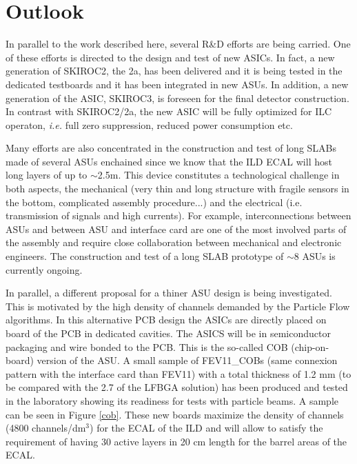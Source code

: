 \documentclass[a4paper,11pt]{article}
\begin{document}
\section{Outlook}
\label{sec:outlook}

In parallel to the work described here, several R\&D efforts are being carried.
One of these efforts is directed to the design and test of new ASICs.
In fact, a new generation of SKIROC2, the 2a, has been delivered
and it is being tested in the dedicated testboards and it has been integrated in new ASUs.
In addition, a new generation of the ASIC, SKIROC3, is foreseen for the final detector construction.
In contrast with SKIROC2/2a, the new ASIC will be fully optimized for ILC operaton, {\it i.e.} full zero suppression, reduced power consumption etc.

Many efforts are also concentrated in the construction and test of long SLABs
made of several ASUs enchained since we know that the ILD ECAL will host long layers of up to $\sim$2.5m.
This device constitutes a technological challenge in both aspects, the mechanical
(very thin and long structure with fragile sensors in the bottom, complicated assembly procedure...)
and the electrical (i.e. transmission of signals and high currents).
For example, interconnections between ASUs and between ASU and interface card are one of
the most involved parts of the assembly
and require close collaboration between mechanical and electronic engineers.
The construction and test of a long SLAB prototype
of $\sim8$ ASUs is currently ongoing.

In parallel, a different proposal for a thiner ASU
design is being investigated. This is motivated by the high density of channels
demanded by the Particle Flow algorithms. 
In this alternative PCB design the ASICs
are directly placed on board of the PCB in dedicated cavities.
The ASICS will be in semiconductor packaging and wire bonded to the PCB. This is the so-called COB (chip-on-board) version of the ASU.
A small sample of FEV11\_COBs (same connexion pattern with the interface card than FEV11)
with a total thickness of 1.2 mm (to be compared with the 2.7 of the LFBGA solution)
has been produced and tested in the laboratory
showing its readiness for tests with particle beams. A sample can be seen in Figure \ref{cob}.
These new boards maximize the density of channels (4800 channels/dm$^{3}$) for the ECAL of the ILD
and will allow to satisfy the requirement of having 30 active layers in 20 cm length
for the barrel areas of the ECAL.
\end{document}
